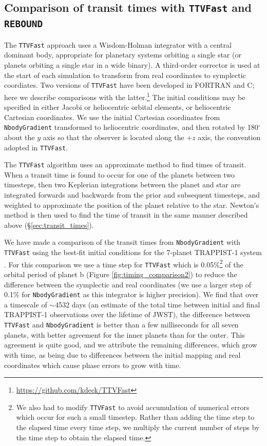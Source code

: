 \documentclass[fleqn,usenatbib,twocolumn]{mnras}
\begin{document}
\subsection{Comparison of transit times with \texttt{TTVFast} and \texttt{REBOUND}}

The \texttt{TTVFast} approach uses a Wisdom-Holman integrator \citep{Wisdom1991} with a central dominant body, appropriate for planetary systems orbiting a single star (or planets orbiting a single star in a wide binary).   A third-order corrector is used at the start of each simulation to transform from real coordinates to symplectic coordiates.   Two versions of \texttt{TTVFast} have been developed in FORTRAN and C;  here we describe comparisons with the latter.\footnote{\url{https://github.com/kdeck/TTVFast}} The initial conditions may be specified in either Jacobi or heliocentric orbital elements, or heliocentric Cartesian coordinates.  We use the initial Cartesian coordinates from \texttt{NbodyGradient} transformed to heliocentric coordinates, and then rotated by 180$^\circ$ about the $y$ axis so that the observer is located along the +$z$ axis, the convention adopted in \texttt{TTVFast}.

The \texttt{TTVFast} algorithm uses an approximate method to find times of transit.  When a transit time is found to occur for one of the planets between two timesteps, then two Keplerian integrations
between the planet and star are integrated forwards and backwards from the prior and subsequent timesteps, and weighted to approximate the position of the planet relative to the star.  Newton's method is then used to find the time of transit in the same manner described above (\S \ref{sec:transit_times}).

We have made a comparison of the transit times from \texttt{NbodyGradient} with \texttt{TTVFast} using the best-fit initial conditions for the 7-planet TRAPPIST-1 system
\citep{Agol2021}.  For this comparison we use a time step for \texttt{TTVFast} which is 0.05\%\footnote{We also had to modify \texttt{TTVFast} to avoid accumulation of numerical errors which occur for such a small timestep.  Rather than adding the time step to the elapsed time every time step, we multiply the current number of steps by the time step to obtain the elapsed time.} of the orbital period of planet b (Figure \ref{fig:timing_comparison2}) to reduce the difference between the symplectic and real coordinates (we use a larger step of 0.1\% for \texttt{NbodyGradient} as this integrator is higher precision).  We find that over a timescale
of $\sim$4532 days (an estimate of the total time between initial and final TRAPPIST-1 observations over the lifetime of JWST), the difference between \texttt{TTVFast} and \texttt{NbodyGradient} is better than a few milliseconds for all seven planets, with better agreement for the inner planets than for the outer.  This agreement is quite good, and we attribute the remaining differences, which grow with time, as being due to differences between the initial mapping and real coordinates which cause phase errors to grow with time.
\end{document}
